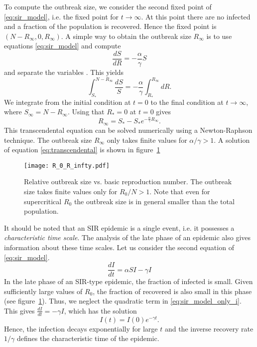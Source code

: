 To compute the outbreak size, we consider the second fixed point of \eqref{eq:sir_model}, i.e. the fixed point for $t \rightarrow \infty $.
At this point there are no infected and a fraction of the population is recovered.
Hence the fixed point is $(N-R_\infty , 0, R_\infty )$.
A simple way to obtain the outbreak size $R_\infty $ is to use equations \eqref{eq:sir_model} and compute 
\[
\frac{dS}{dR}=-\frac{\alpha }{\gamma } S 
\]
and separate the variables \citep{Chasnov:2010}.
This yields
\[
\int _{S_*} ^{N-R_\infty} \frac{dS}{S}=-\frac{\alpha }{\gamma } \int _{R_*} ^{R_\infty} dR .
\]
We integrate from the initial condition at $t=0$ to the final condition at $t \rightarrow \infty$, where $S_\infty = N-R_\infty $.
Using that $R_* =0$ at $t=0$ gives 
\begin{equation}\label{eq:transcendental}
R_\infty = S_*-S_* e ^{-\frac{\alpha}{\gamma}R_\infty}.
\end{equation}
This transcendental equation can be solved numerically using a Newton-Raphson technique.
The outbreak size $R_\infty $ only takes finite values for $\alpha / \gamma > 1$.
A solution of equation \eqref{eq:transcendental} is shown in figure~\ref{fig:transcendental}
%
\begin{figure}[htbp]
\begin{center}
\texttt{[image: R\_0\_R\_infty.pdf]}
\caption{Relative outbreak size vs. basic reproduction number.
The outbreak size takes finite values only for $R_0/N >1$.
Note that even for supercritical $R_0$ the outbreak size is in general smaller than the total population.
}
\label{fig:transcendental}
\end{center}
\end{figure}

It should be noted that an SIR epidemic is a single event, i.e. it possesses a \emph{characteristic time scale}.
The analysis of the late phase of an epidemic also gives information about these time scales.
Let us consider the second equation of \eqref{eq:sir_model}.
\begin{equation}\label{eq:sir_model_only_i}
\frac{dI}{dt} = \alpha SI -\gamma I
\end{equation}
In the late phase of an SIR-type epidemic, the fraction of infected is small.
Given sufficiently large values of $R_0$, the fraction of recovered is also small in this phase (see figure~\ref{fig:transcendental}).
Thus, we neglect the quadratic term in \eqref{eq:sir_model_only_i}.
This gives $\frac{dI}{dt} = -\gamma I $, which has the solution
\begin{equation}\label{eq:sir_characteristic_time_scale_gamma}
I(t)=I(0)e^{-\gamma t}.
\end{equation}
Hence, the infection decays exponentially for large $t$ and the inverse recovery rate $1/\gamma $ defines the characteristic time of the epidemic.

